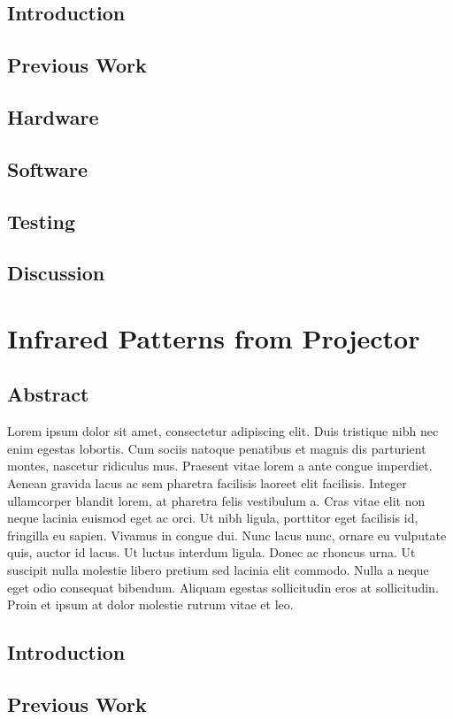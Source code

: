 \documentclass[12pt]{report}	%
\begin{document}
\section{Introduction}
\section{Previous Work}
\section{Hardware}
\section{Software}
\section{Testing}
\section{Discussion}
	
\chapter{Infrared Patterns from Projector}
\section{Abstract}
Lorem ipsum dolor sit amet, consectetur adipiscing elit. Duis tristique
nibh nec enim egestas lobortis. Cum sociis natoque penatibus et magnis
dis parturient montes, nascetur ridiculus mus. Praesent vitae lorem a
ante congue imperdiet. Aenean gravida lacus ac sem pharetra facilisis
laoreet elit facilisis. Integer ullamcorper blandit lorem, at pharetra
felis vestibulum a. Cras vitae elit non neque lacinia euismod eget ac
orci. Ut nibh ligula, porttitor eget facilisis id, fringilla eu
sapien. Vivamus in congue dui. Nunc lacus nunc, ornare eu vulputate
quis, auctor id lacus. Ut luctus interdum ligula. Donec ac rhoncus
urna. Ut suscipit nulla molestie libero pretium sed lacinia elit
commodo. Nulla a neque eget odio consequat bibendum. Aliquam egestas
sollicitudin eros at sollicitudin. Proin et ipsum at dolor molestie
rutrum vitae et leo.

\section{Introduction}
\section{Previous Work}
\end{document}
